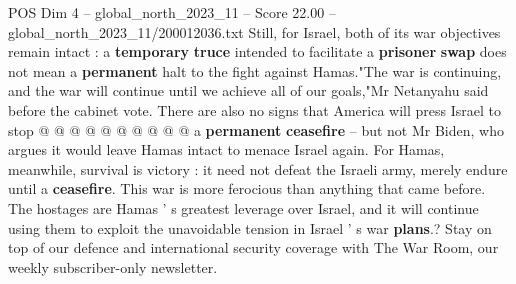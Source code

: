 \begin{textsample}{POS Dim 4 – global\_north\_2023\_11 – Score 22.00 – global\_north\_2023\_11/200012036.txt}
Still, for Israel, both of its war objectives remain intact : a \textbf{temporary} \textbf{truce} intended to facilitate a \textbf{prisoner} \textbf{swap} does not mean a \textbf{permanent} halt to the fight against Hamas."The war is continuing, and the war will continue until we achieve all of our goals,"Mr Netanyahu said before the cabinet vote.
There are also no signs that America will press Israel to stop @ @ @ @ @ @ @ @ @ @ a \textbf{permanent} \textbf{ceasefire} -- but not Mr Biden, who argues it would leave Hamas intact to menace Israel again.
For Hamas, meanwhile, survival is victory : it need not defeat the Israeli army, merely endure until a \textbf{ceasefire}.
This war is more ferocious than anything that came before.
The hostages are Hamas ' s greatest leverage over Israel, and it will continue using them to exploit the unavoidable tension in Israel ' s war \textbf{plans}.?
Stay on top of our defence and international security coverage with The War Room, our weekly subscriber-only newsletter.

\end{textsample}

